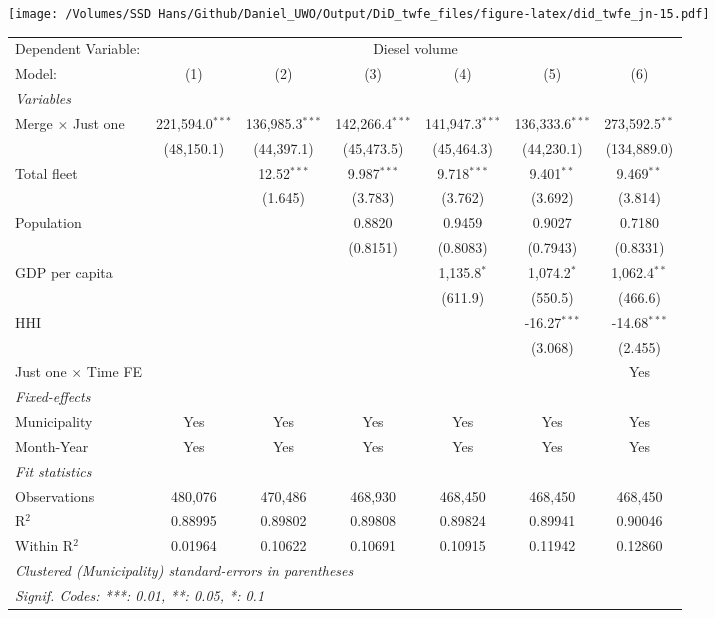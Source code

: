 \documentclass[
]{article}
\begin{document}
\texttt{[image: /Volumes/SSD Hans/Github/Daniel\_UWO/Output/DiD\_twfe\_files/figure-latex/did\_twfe\_jn-15.pdf]}

\begin{tabular}{lcccccc}
\tabularnewline\midrule\midrule
Dependent Variable:&\multicolumn{6}{c}{Diesel volume}\\
Model:&(1) & (2) & (3) & (4) & (5) & (6)\\
\midrule \emph{Variables}&   &   &   &   &   &  \\
Merge $\times $ Just one & 221,594.0$^{***}$ & 136,985.3$^{***}$ & 142,266.4$^{***}$ & 141,947.3$^{***}$ & 136,333.6$^{***}$ & 273,592.5$^{**}$\\
  &(48,150.1) & (44,397.1) & (45,473.5) & (45,464.3) & (44,230.1) & (134,889.0)\\
Total fleet &    & 12.52$^{***}$ & 9.987$^{***}$ & 9.718$^{***}$ & 9.401$^{**}$ & 9.469$^{**}$\\
  &   & (1.645) & (3.783) & (3.762) & (3.692) & (3.814)\\
Population &    &    & 0.8820 & 0.9459 & 0.9027 & 0.7180\\
  &   &    & (0.8151) & (0.8083) & (0.7943) & (0.8331)\\
GDP per capita &    &    &    & 1,135.8$^{*}$ & 1,074.2$^{*}$ & 1,062.4$^{**}$\\
  &   &    &    & (611.9) & (550.5) & (466.6)\\
HHI &    &    &    &    & -16.27$^{***}$ & -14.68$^{***}$\\
  &   &    &    &    & (3.068) & (2.455)\\
Just one $\times$ Time FE &  &  &  &  &  & Yes\\
\midrule \emph{Fixed-effects}&   &   &   &   &   &  \\
Municipality & Yes & Yes & Yes & Yes & Yes & Yes\\
Month-Year & Yes & Yes & Yes & Yes & Yes & Yes\\
\midrule \emph{Fit statistics}&  & & & & & \\
Observations & 480,076&470,486&468,930&468,450&468,450&468,450\\
R$^2$ & 0.88995&0.89802&0.89808&0.89824&0.89941&0.90046\\
Within R$^2$ & 0.01964&0.10622&0.10691&0.10915&0.11942&0.12860\\
\midrule\midrule\multicolumn{7}{l}{\emph{Clustered (Municipality) standard-errors in parentheses}}\\
\multicolumn{7}{l}{\emph{Signif. Codes: ***: 0.01, **: 0.05, *: 0.1}}\\
\end{tabular}
\end{document}
